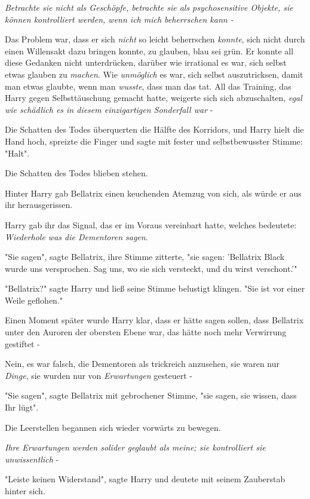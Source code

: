 {\emph{\emph{Betrachte sie nicht als Geschöpfe, betrachte sie als psychosensitive Objekte, sie können kontrolliert werden, wenn ich mich beherrschen kann -}}

Das Problem war, dass er sich \emph{nicht} so leicht beherrschen \emph{konnte}, sich nicht durch einen Willensakt dazu bringen konnte, zu glauben, blau sei grün. Er konnte all diese Gedanken nicht unterdrücken, darüber wie irrational es war, sich selbst etwas glauben zu \emph{machen}. Wie \emph{unmöglich} es war, sich selbst auszutricksen, damit man etwas glaubte, wenn man \emph{wusste}, dass man das tat. All das Training, das Harry gegen Selbsttäuschung gemacht hatte, weigerte sich sich abzuschalten, \emph{egal wie schädlich es in diesem einzigartigen Sonderfall war} -

Die Schatten des Todes überquerten die Hälfte des Korridors, und Harry hielt die Hand hoch, spreizte die Finger und sagte mit fester und selbstbewusster Stimme: "Halt".

Die Schatten des Todes blieben stehen.

Hinter Harry gab Bellatrix einen keuchenden Atemzug von sich, als würde er aus ihr herausgerissen.

Harry gab ihr das Signal, das er im Voraus vereinbart hatte, welches bedeutete: \emph{Wiederhole was die Dementoren sagen}.

"Sie sagen", sagte Bellatrix, ihre Stimme zitterte, "sie sagen: 'Bellatrix Black wurde uns versprochen. Sag uns, wo sie sich versteckt, und du wirst verschont.'"

"Bellatrix?" sagte Harry und ließ seine Stimme belustigt klingen. "Sie ist vor einer Weile geflohen."

Einen Moment später wurde Harry klar, dass er hätte sagen sollen, dass Bellatrix unter den Auroren der obersten Ebene war, das hätte noch mehr Verwirrung gestiftet -

Nein, es war falsch, die Dementoren als trickreich anzusehen, sie waren nur \emph{Dinge}, sie wurden nur von \emph{Erwartungen} gesteuert -

"Sie sagen", sagte Bellatrix mit gebrochener Stimme, "sie sagen, sie wissen, dass Ihr lügt".

Die Leerstellen begannen sich wieder vorwärts zu bewegen.

\emph{Ihre Erwartungen werden solider geglaubt als meine; sie kontrolliert sie unwissentlich} -

"Leiste keinen Widerstand", sagte Harry und deutete mit seinem Zauberstab hinter sich.

}
